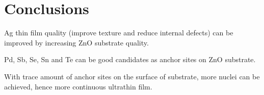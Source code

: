 \section{Conclusions}

Ag thin film quality (improve texture and reduce internal defects) can be improved by increasing ZnO substrate quality.

Pd, Sb, Se, Sn and Te can be good candidates as anchor sites on ZnO substrate.

With trace amount of anchor sites on the surface of substrate, more nuclei can be achieved, hence more continuous ultrathin film.
